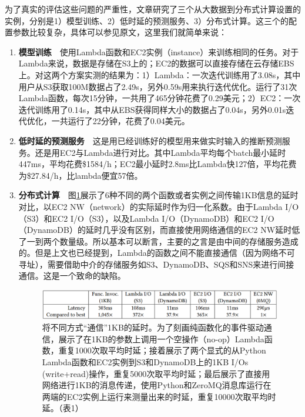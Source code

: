 \documentclass[11pt]{article}
\begin{document}
为了真实的评估这些问题的严重性，文章\cite{hellerstein2018serverless}研究了三个从大数据到分布式计算设置的实例，分别是1）模型训练、2）低时延的预测服务、3）分布式计算。这三个的配置参数比较复杂，具体可以参见原文，这里我们就简单来说：
\begin{enumerate}
	\item \textbf{模型训练}\ \ 使用Lambda函数和EC2实例（instance）来训练相同的任务。对于Lambda来说，数据是存储在S3上的；EC2的数据可以直接存储在云存储EBS上。对这两个方案实测的结果为：1）Lambda：一次迭代训练用了3.08s，其中用户从S3获取100M数据占了2.49s，另外0.59s用来执行迭代优化。运行了31次Lambda函数，每次15分钟，一共用了465分钟花费了0.29美元；2）EC2：一次迭代训练用了0.14s，其中从EBS获得同样大小的数据占了0.04s，另外0.01s迭代优化，一共运行了22分钟，花费了0.04美元。
	\item \textbf{低时延的预测服务}\ \ 这是用已经训练好的模型用来做实时输入的推断预测服务。还是用EC2与Lambda进行对比。其中Lambda平均每个batch最小延时447ms，平均花费\$1584/h；EC2最小延时2.8ms比Lambda快127倍，平均花费为\$27.84/h，比lambda便宜57倍。
	\item \textbf{分布式计算}\ \ 图\ref{figs:latency}展示了6种不同的两个函数或者实例之间传输1KB信息的延时对比，以EC2 NW（network）的实际延时作为归一化系数。由于Lambda I/O（S3）和EC2 I/O（S3），以及Lambda I/O（DynamoDB）和EC2 I/O（DynamoDB）的延时几乎没有区别，而直接使用网络通信的EC2 NW延时低了一到两个数量级。所以基本可以断言，主要的之言是由中间的存储服务造成的。但是上文也已经提到，Lambda的函数之间不能直接通信（因为网络不可寻址），需要借助中介的存储服务如S3、DynamoDB、SQS和SNS来进行间接通信。这是一个致命的缺陷。
	\begin{figure}[!htbp]
		\centering
		\includegraphics[width=0.7\linewidth]{figs/latency}
		\caption{将不同方式``通信''1KB的延时。为了刻画纯函数化的事件驱动通信，展示了在1KB的参数上调用一个空操作（no-op）Lambda函数，重复1000次取平均时延；接着展示了两个显式的从Python Lambda函数和EC2实例到S3和DynamoDB上的1KB I/Os (write+read)操作，重复5000次取平均时延；最后展示了直接用网络进行1KB的消息传递，使用Python和ZeroMQ消息库运行在两端的EC2实例上运行来测量出来的时延，重复10000次取平均时延。（\cite{hellerstein2018serverless}表1）}
		\label{figs:latency}
	\end{figure}
\end{enumerate}
\end{document}
